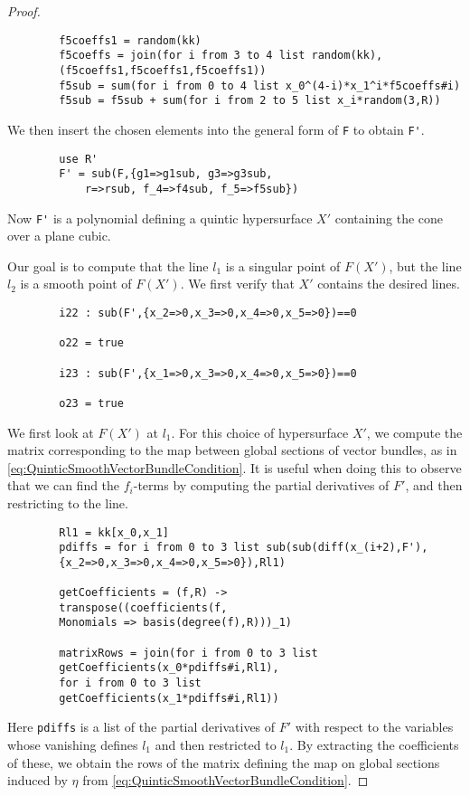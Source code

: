 \begin{proof}
\begin{verbatim}
		f5coeffs1 = random(kk)
		f5coeffs = join(for i from 3 to 4 list random(kk),
		(f5coeffs1,f5coeffs1,f5coeffs1))
		f5sub = sum(for i from 0 to 4 list x_0^(4-i)*x_1^i*f5coeffs#i)
		f5sub = f5sub + sum(for i from 2 to 5 list x_i*random(3,R))
	\end{verbatim}
		We then insert the chosen elements into the general form of \lstinline{F} to obtain \lstinline{F'}.
	\begin{verbatim}
		use R'
		F' = sub(F,{g1=>g1sub, g3=>g3sub,
			r=>rsub, f_4=>f4sub, f_5=>f5sub})
	\end{verbatim}
	Now \lstinline{F'} is a polynomial defining a quintic hypersurface $X'$ containing the cone over a plane cubic.
	
	Our goal is to compute that the line $l_1$ is a singular point of $F(X')$, but the line $l_2$ is a smooth point of $F(X')$. We first verify that $X'$ contains the desired lines.
	\begin{verbatim}
		i22 : sub(F',{x_2=>0,x_3=>0,x_4=>0,x_5=>0})==0
		
		o22 = true
		
		i23 : sub(F',{x_1=>0,x_3=>0,x_4=>0,x_5=>0})==0
		
		o23 = true
	\end{verbatim}
	
	We first look at $F(X')$ at $l_1$. For this choice of hypersurface $X'$, we compute the matrix corresponding to the map between global sections of vector bundles, as in \eqref{eq:QuinticSmoothVectorBundleCondition}. It is useful when doing this to observe that we can find the $f_i$-terms by computing the partial derivatives of $F'$, and then restricting to the line.
	\begin{verbatim}
		Rl1 = kk[x_0,x_1]
		pdiffs = for i from 0 to 3 list sub(sub(diff(x_(i+2),F'),
		{x_2=>0,x_3=>0,x_4=>0,x_5=>0}),Rl1)
		
		getCoefficients = (f,R) -> 
		transpose((coefficients(f,
		Monomials => basis(degree(f),R)))_1)
		
		matrixRows = join(for i from 0 to 3 list 
		getCoefficients(x_0*pdiffs#i,Rl1),
		for i from 0 to 3 list 
		getCoefficients(x_1*pdiffs#i,Rl1))

	\end{verbatim}
	Here \lstinline{pdiffs} is a list of the partial derivatives of $F'$ with respect to the variables whose vanishing defines $l_1$ and then restricted to $l_1$. By extracting the coefficients of these, we obtain the rows of the matrix defining the map on global sections induced by $\eta$ from \cref{eq:QuinticSmoothVectorBundleCondition}.
	

\end{proof}
